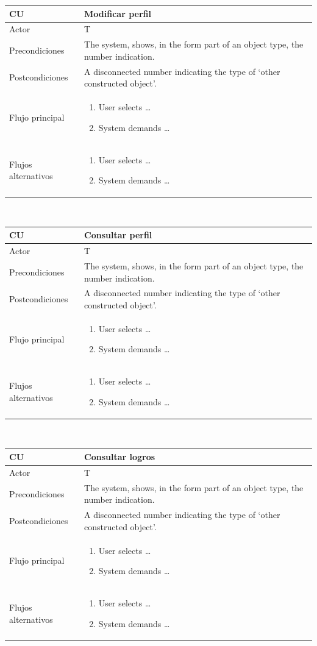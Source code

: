 \documentclass[twoside]{report}
\newcommand\addrow[2]{#1 &#2\\ }
\newcommand\addheading[2]{#1 &#2\\ \hline}
\newcommand\tabularhead{\begin{tabular}{lp{0.7\textwidth}}
\hline
}
\newcommand\addmulrow[2]{ \begin{minipage}[t][][t]{2.5cm}#1\end{minipage}%
   &\begin{minipage}[t][][t]{8cm}
    \begin{enumerate} #2   \end{enumerate}
    \end{minipage}\\ }
\newenvironment{usecase}{\tabularhead}
{\hline\end{tabular}}
\begin{document}
\begin{usecase}
  \addheading{\textbf{CU\arabic{usecase}}}{Modificar perfil} 
  \addrow{Actor}{T}
  \addrow{Precondiciones}{The system, shows, in the form part of an object type, the number indication.}
  \addrow{Postcondiciones}{A disconnected number indicating the type of `other constructed object'.}
  \addmulrow{Flujo principal}{
  		\item User selects \ldots
        \item System demands \ldots
  }
  \addmulrow{Flujos alternativos}{
  		\item User selects \ldots
        \item System demands \ldots
  }
\end{usecase}\\

\begin{usecase}
  \addheading{\textbf{CU\arabic{usecase}}}{Consultar perfil} 
  \addrow{Actor}{T}
  \addrow{Precondiciones}{The system, shows, in the form part of an object type, the number indication.}
  \addrow{Postcondiciones}{A disconnected number indicating the type of `other constructed object'.}
  \addmulrow{Flujo principal}{
  		\item User selects \ldots
        \item System demands \ldots
  }
  \addmulrow{Flujos alternativos}{
  		\item User selects \ldots
        \item System demands \ldots
  }
\end{usecase}\\

\begin{usecase}
  \addheading{\textbf{CU\arabic{usecase}}}{Consultar logros} 
  \addrow{Actor}{T}
  \addrow{Precondiciones}{The system, shows, in the form part of an object type, the number indication.}
  \addrow{Postcondiciones}{A disconnected number indicating the type of `other constructed object'.}
  \addmulrow{Flujo principal}{
  		\item User selects \ldots
        \item System demands \ldots
  }
  \addmulrow{Flujos alternativos}{
  		\item User selects \ldots
        \item System demands \ldots
  }
\end{usecase}\\
\end{document}
